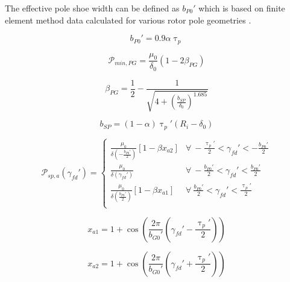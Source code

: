 The effective pole shoe width can be defined as ${b}_{P0}'$ which is based on finite element method data calculated for various rotor pole geometries \cite{AnaGapSal}.
 
\begin{equation}\label{Eq:bpo}
	{b}_{P0}' = 0.9\alpha{\uptau}_{p}
\end{equation}

\begin{equation}\label{Eq:Permin}
	{\mathcal{P}}_{min,PG} = \frac{{\mu}_{0}}{{\delta}_{0}}\left(1 - 2{\beta}_{PG}\right)
\end{equation}

\begin{equation}\label{Eq:Betapg}
	{\beta}_{PG} = \frac{1}{2} - \frac{1}{\sqrt{4 + \left(\frac{{b}_{SP}}{{\delta}_{0}}\right)^{1.685}}}
\end{equation}

\begin{equation}\label{Eq:bsp}
	{b}_{SP} = \left(1 - \alpha\right){\uptau}_{p}'\left({R}_{i} - {\delta}_{0}\right)
\end{equation}

\begin{equation}\label{Eq:SPGPermas}
	\mathcal{P}_{sp,a}({\gamma}_{fd}') = 
	\begin{cases}
		\frac{{\mu}_{0}}{\delta(-\frac{{b}_{P0}'}{2})} \left[ 1 - \beta{x}_{a2} \right] & \forall \: -\frac{{\uptau}_{p}'}{2} < {\gamma}_{fd}' < -\frac{{b}_{P0}'}{2} \\ 
		\frac{{\mu}_{0}}{\delta({\gamma}_{fd}')} & \forall \: -\frac{{b}_{P0}'}{2} < {\gamma}_{fd}' < \frac{{b}_{P0}'}{2} \\
		\frac{{\mu}_{0}}{\delta(\frac{{b}_{P0}'}{2})} \left[ 1 - \beta{x}_{a1} \right] & \forall \: \frac{{b}_{P0}'}{2} < {\gamma}_{fd}' < \frac{{\uptau}_{p}'}{2} \\
	\end{cases}
\end{equation}

\begin{equation}\label{Eq:SPGPermax1}
	{x}_{a1} = 1 + \cos\left(\frac{2\pi}{{b}_{G0}'} \left({\gamma}_{fd}' - \frac{{\uptau}_{p}'}{2}\right) \right)
\end{equation}

\begin{equation}\label{Eq:SPGPermax2}
	{x}_{a2} = 1 + \cos\left(\frac{2\pi}{{b}_{G0}'} \left({\gamma}_{fd}' + \frac{{\uptau}_{p}'}{2}\right) \right)
\end{equation}

